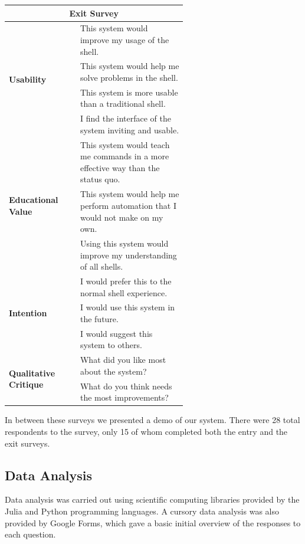 \begin{center}
  \begin{tabular}{|l|p{0.6\linewidth}|}
    \hline \multicolumn{2}{|c|}{\textbf{\Large Exit Survey}} \\ \hline
    \multirow{4}{*}{\textbf{Usability}}
    & This system would improve my usage of the shell. \\ \cline{2-2}
    & This system would help me solve problems in the shell. \\ \cline{2-2}
    & This system is more usable than a traditional shell. \\ \cline{2-2}
    & I find the interface of the system inviting and usable. \\
    \hline
    \multirow{3}{*}{\textbf{Educational Value}}
    & This system would teach me commands in a more effective way than the
      status quo. \\ \cline{2-2}
    & This system would help me perform automation that I would not make on my
      own.\\ \cline{2-2}
    & Using this system would improve my understanding of all shells.\\
    \hline
    \multirow{3}{*}{\textbf{Intention}}
    & I would prefer this to the normal shell experience. \\ \cline{2-2}
    & I would use this system in the future. \\ \cline{2-2}
    & I would suggest this system to others. \\
    \hline
    \multirow{2}{*}{\textbf{Qualitative Critique}}
    & What did you like most about the system?  \\ \cline{2-2}
    & What do you think needs the most improvements? \\
    \hline
  \end{tabular}
\end{center}

In between these surveys we presented a demo of our system. There were 28 total
respondents to the survey, only 15 of whom completed both the entry and the exit
surveys.

\subsection{Data Analysis}

Data analysis was carried out using scientific computing libraries provided by
the Julia and Python programming languages. A cursory data analysis was also
provided by Google Forms, which gave a basic initial overview of the responses
to each question.


